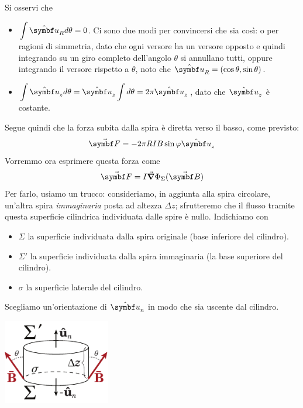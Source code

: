 Si osservi che
\begin{itemize}
	\item $\displaystyle\int\vbh{u}_Rd\theta=0$. Ci sono due modi per convincersi che sia così: o per ragioni di simmetria, dato che ogni versore ha un versore opposto e quindi integrando su un giro completo dell'angolo $\theta$ si annullano tutti, oppure integrando il versore rispetto a $\theta$, noto che $\vbh{u}_R=\left(\cos\theta,\sin\theta\right)$. 
	\item $\displaystyle\int\vbh{u}_zd\theta=\vbh{u}_z\int d\theta=2\pi\vbh{u}_z$, dato che $\vbh{u}_z$ è costante.
\end{itemize}
Segue quindi che la forza subita dalla spira è diretta verso il basso, come previsto:
\begin{equation}
	\vba{F}=-2\pi R I B\sin\phi\vbh{u}_z
\end{equation}
Vorremmo ora esprimere questa forza come
\begin{equation*}
	\vba{F}=I\grad{\Phi_{\Sigma}(\vba{B})}
\end{equation*}
Per farlo, usiamo un trucco: consideriamo, in aggiunta alla spira circolare, un'altra spira \textit{immaginaria} posta ad altezza $\Delta z$; sfrutteremo che il flusso tramite questa superficie cilindrica individuata dalle spire è nullo. Indichiamo con
\begin{itemize}
	\item $\Sigma$ la superficie individuata dalla spira originale (base inferiore del cilindro).
	\item $\Sigma'$ la superficie individuata dalla spira immaginaria (la base superiore del cilindro).
	\item $\sigma$ la superficie laterale del cilindro.
\end{itemize}
Scegliamo un'orientazione di $\vbh{u}_n$ in modo che sia uscente dal cilindro.
\begin{center}
	\includegraphics[width=0.35\textwidth]{images/chp8/chp8magnetecilindrico3.pdf}
\end{center}
